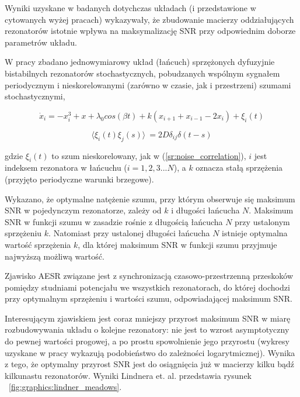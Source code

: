   Wyniki uzyskane w badanych dotychczas układach (i przedstawione w cytowanych wyżej pracach) wykazywały, że zbudowanie macierzy oddziałujących rezonatorów istotnie wpływa na maksymalizację SNR przy odpowiednim doborze parametrów układu.

  W pracy \cite{lindner_meadows} zbadano jednowymiarowy układ (łańcuch) sprzężonych dyfuzyjnie bistabilnych rezonatorów stochastycznych, pobudzanych wspólnym sygnałem periodycznym i nieskorelowanymi (zarówno w czasie, jak i przestrzeni) szumami stochastycznymi,

  \begin{equation}
    \dot x_i = -x_i^3 + x + \lambda_0 cos(\beta t) + k(x_{i+1} + x_{i-1} -2 x_{i}) + \xi_i (t)
  \end{equation}

  \begin{equation}
    \langle \xi_i(t) \xi_j(s) \rangle\ = 2 D \delta_{ij} \delta (t-s)
  \end{equation}

  gdzie $\xi_i(t)$ to szum nieskorelowany, jak w (\ref{sr:noise_correlation}), $i$ jest indeksem rezonatora w łańcuchu ($ i = 1,2,3...N$), a $k$ oznacza stałą sprzężenia (przyjęto periodyczne warunki brzegowe).

  Wykazano, że optymalne natężenie szumu, przy którym obserwuje się maksimum SNR w pojedynczym rezonatorze, zależy od $k$ i długości łańcucha $N$. Maksimum SNR w funkcji szumu w zasadzie rośnie z długością łańcucha $N$ przy ustalonym sprzężeniu $k$. Natomiast przy ustalonej długości łańcucha $N$ istnieje optymalna wartość sprzężenia $k$, dla której maksimum SNR w funkcji szumu przyjmuje najwyższą możliwą wartość.

  Zjawisko AESR związane jest z synchronizacją czasowo-przestrzenną przeskoków pomiędzy studniami potencjału we wszystkich rezonatorach, do której dochodzi przy optymalnym sprzężeniu i wartości szumu, odpowiadającej maksimum SNR.

  Interesującym zjawiskiem jest coraz mniejszy przyrost maksimum SNR w miarę rozbudowywania układu o kolejne rezonatory: nie jest to wzrost asymptotyczny do pewnej wartości progowej, a po prostu spowolnienie jego przyrostu (wykresy uzyskane w pracy \cite{lindner_meadows} wykazują podobieństwo do zależności logarytmicznej). Wynika z tego, że optymalny przyrost SNR jest do osiągnięcia już w macierzy kilku bądź kilkunastu rezonatorów. Wyniki Lindnera et. al. \cite{lindner_meadows} przedstawia rysunek ~\ref{fig:graphics:lindner_meadows}.

